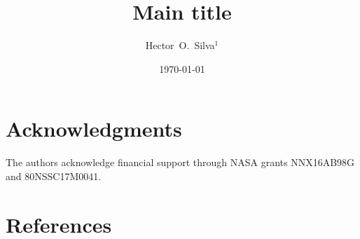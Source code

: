 \documentclass[12pt]{iopart}
\begin{document}
\title[Mini-title]{\sc Main title}

\author{\sc
Hector~O.~Silva$^{1}$
}

\address{$^{1}$~eXtreme Gravity Institute, Department of Physics,
Montana State University, Bozeman, MT 59717, USA.}

\date{\today}

\begin{abstract}
\end{abstract}

\maketitle


\section*{Acknowledgments}

The authors acknowledge financial support through
NASA grants NNX16AB98G and 80NSSC17M0041.

\section*{References}


\end{document}
